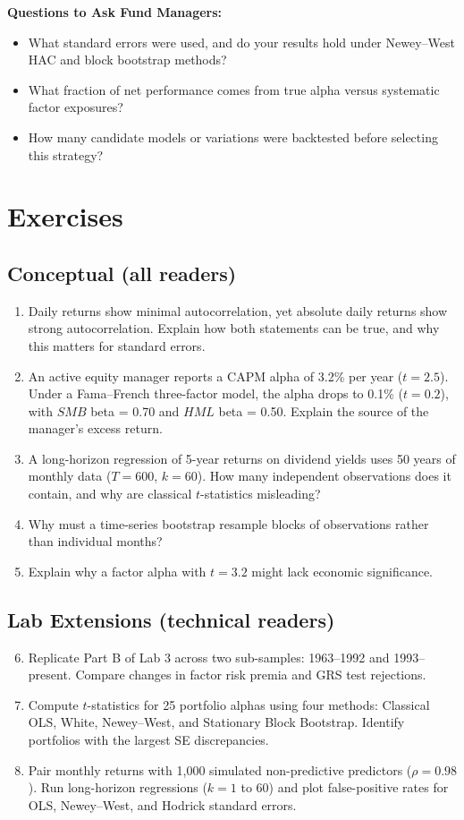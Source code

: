 \textbf{Questions to Ask Fund Managers:}
\begin{itemize}
  \item What standard errors were used, and do your results hold under Newey--West HAC and block bootstrap methods?
  \item What fraction of net performance comes from true alpha versus systematic factor exposures?
  \item How many candidate models or variations were backtested before selecting this strategy?
\end{itemize}

\section*{Exercises}

\subsection*{Conceptual (all readers)}
\begin{enumerate}
  \item Daily returns show minimal autocorrelation, yet absolute daily returns show strong autocorrelation. Explain how both statements can be true, and why this matters for standard errors.
  \item An active equity manager reports a CAPM alpha of 3.2\% per year ($t = 2.5$). Under a Fama--French three-factor model, the alpha drops to 0.1\% ($t = 0.2$), with $SMB$ beta = 0.70 and $HML$ beta = 0.50. Explain the source of the manager's excess return.
  \item A long-horizon regression of 5-year returns on dividend yields uses 50 years of monthly data ($T=600$, $k=60$). How many independent observations does it contain, and why are classical $t$-statistics misleading?
  \item Why must a time-series bootstrap resample blocks of observations rather than individual months?
  \item Explain why a factor alpha with $t = 3.2$ might lack economic significance.
\end{enumerate}

\subsection*{Lab Extensions (technical readers)}
\begin{enumerate}
  \setcounter{enumi}{5}
  \item Replicate Part B of Lab 3 across two sub-samples: 1963--1992 and 1993--present. Compare changes in factor risk premia and GRS test rejections.
  \item Compute $t$-statistics for 25 portfolio alphas using four methods: Classical OLS, White, Newey--West, and Stationary Block Bootstrap. Identify portfolios with the largest SE discrepancies.
  \item Pair monthly returns with 1,000 simulated non-predictive predictors ($\rho = 0.98$). Run long-horizon regressions ($k=1$ to $60$) and plot false-positive rates for OLS, Newey--West, and Hodrick standard errors.
\end{enumerate}

